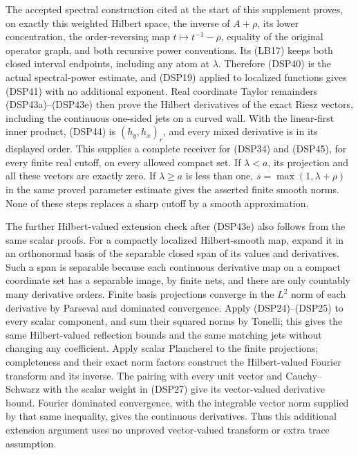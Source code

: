 \documentclass[
  11pt,
]{article}
\makeatletter
\let\ReaderOriginalAnchorStart\hyper@anchorstart
\let\ReaderOriginalAnchorEnd\hyper@anchorend
\let\ReaderPendingAliases\@empty
\def\ReaderArmAliases#1{\gdef\ReaderPendingAliases{#1}}
\def\hyper@anchorstart#1{\ReaderIfNativeAnchorTF{#1}{\ReaderPendingAliases\global\let\ReaderPendingAliases\@empty}{}\ReaderOriginalAnchorStart{#1}}
\makeatother
\begin{document}
The accepted spectral construction cited at the start of this supplement
proves, on exactly this weighted Hilbert space, the inverse of
\(A+\rho\), its lower concentration, the order-reversing map
\(t\mapsto t^{-1}-\rho\), equality of the original operator graph, and
both recursive power conventions. Its (LB17) keeps both closed interval
endpoints, including any atom at \(\lambda\). Therefore (DSP40) is the
actual spectral-power estimate, and (DSP19) applied to localized
functions gives (DSP41) with no additional exponent. Real coordinate
Taylor remainders (DSP43a)--(DSP43e) then prove the Hilbert derivatives
of the exact Riesz vectors, including the continuous one-sided jets on a
curved wall. With the linear-first inner product, (DSP44) is
\((h_y,h_x)_r\), and every mixed derivative is in its displayed order.
This supplies a complete receiver for (DSP34) and (DSP45), for every
finite real cutoff, on every allowed compact set. If \(\lambda<a\), its
projection and all these vectors are exactly zero. If \(\lambda\geq a\)
is less than one, \(s=\max(1,\lambda+\rho)\) in the same proved
parameter estimate gives the asserted finite smooth norms. None of these
steps replaces a sharp cutoff by a smooth approximation.

The further Hilbert-valued extension check after (DSP43e) also follows
from the same scalar proofs. For a compactly localized Hilbert-smooth
map, expand it in an orthonormal basis of the separable closed span of
its values and derivatives. Such a span is separable because each
continuous derivative map on a compact coordinate set has a separable
image, by finite nets, and there are only countably many derivative
orders. Finite basis projections converge in the \(L^2\) norm of each
derivative by Parseval and dominated convergence. Apply (DSP24)--(DSP25)
to every scalar component, and sum their squared norms by Tonelli; this
gives the same Hilbert-valued reflection bounds and the same matching
jets without changing any coefficient. Apply scalar Plancherel to the
finite projections; completeness and their exact norm factors construct
the Hilbert-valued Fourier transform and its inverse. The pairing with
every unit vector and Cauchy--Schwarz with the scalar weight in (DSP27)
give its vector-valued derivative bound. Fourier dominated convergence,
with the integrable vector norm supplied by that same inequality, gives
the continuous derivatives. Thus this additional extension argument uses
no unproved vector-valued transform or extra trace assumption.

\ReaderArmAliases{\ReaderOriginalAnchorStart{e5.-a-localized-trace-remains-available-without-compact-resolvent}\ReaderOriginalAnchorEnd}
\end{document}
